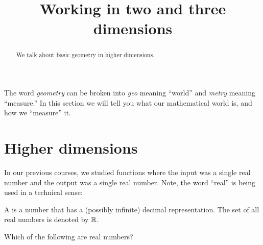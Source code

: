 \documentclass{ximera}
\title[Dig-In:]{Working in two and three dimensions}
\begin{document}
\begin{abstract}
  We talk about basic geometry in higher dimensions.
\end{abstract}
\maketitle


The word \textit{geometry} can be broken into \textit{geo} meaning
``world'' and \textit{metry} meaning ``measure.'' In this section we
will tell you what our mathematical world is, and how we ``measure''
it.

\section{Higher dimensions}

In our previous courses, we studied functions where the input was a
single real number and the output was a single real number. Note, the
word ``real'' is being used in a technical sense:

\begin{definition}
  A  is a number that has a (possibly infinite)
  decimal representation. The set of all real numbers is denoted by
  $\mathbb R$.
\end{definition}
\begin{question}
  Which of the following are real numbers?
  \begin{selectAll}
    \choice[correct]{$\pi$}
    \choice{$\infty$}
  \end{selectAll}
\end{question}
\end{document}
